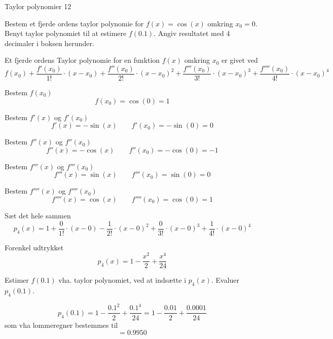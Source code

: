 \documentclass{article}
\begin{document}
\begin{exercise}{Taylor polynomier 12}
	
	Bestem et fjerde ordens taylor polynomie for $f(x) =\cos(x)$ 
	omkring $x_0 = 0$.
	Benyt taylor polynomiet til at estimere $f(0.1)$.
	Angiv resultatet med 4 decimaler i boksen herunder.
	
	\hint
	Et fjerde ordens Taylor polynomie for en funktion $f(x)$
	omkring $x_0$ er givet ved
	\[
	f(x_0) + \frac{f'(x_0)}{1!} \cdot (x - x_0) 
	+ \frac{f''(x_0)}{2!} \cdot (x - x_0)^2 
	+ \frac{f'''(x_0)}{3!} \cdot (x - x_0)^3 
	+ \frac{f''''(x_0)}{4!} \cdot (x - x_0)^4
	\]


	\hint
	Bestem $f(x_0)$
	\[
	f(x_0)  = \cos(0) = 1
	\]

	\hint
	Bestem $f'(x)$ og $f'(x_0)$
	\[
	f'(x) = -\sin(x) \qquad f'(x_0)= -\sin(0) = 0
	\]
	
	\hint
	Bestem $f''(x)$ og $f''(x_0)$	
	\[
	f''(x) = -\cos(x) \qquad f''(x_0)  = - \cos(0) = -1
	\]

	\hint
	Bestem $f'''(x)$ og $f'''(x_0)$
	\[
	f'''(x) = \sin(x) \qquad f'''(x_0) =  \sin(0) = 0
	\]
	
	\hint
	Bestem $f''''(x)$ og $f''''(x_0)$
	\[
	f''''(x) = \cos(x) \qquad f''''(x_0) =  \cos(0) = 1
	\]
	
	\hint
	Sæt det hele sammen
	\[
	p_4(x) = 1 + \frac{0}{1!} \cdot (x-0) - \frac{1}{2!} \cdot (x-0)^2 + \frac{0}{3!} \cdot (x-0)^3	+ \frac{1}{4!} \cdot (x-0)^4
	\]
	
	\hint
	Forenkel udtrykket
	\[
	p_4(x) = 1 - \frac{x^2}{2} + \frac{x^4}{24}
	\]
	
	\hint
	Estimer $f(0.1)$ vha. taylor polynomiet, ved at indsætte i $p_4(x)$.
	Evaluer $p_4(0.1)$.
	
	\hint
	\[
	p_4(0.1) =  1 - \frac{0.1^2}{2} + \frac{0.1^4}{24} = 1 - \frac{0.01}{2} + \frac{0.0001}{24}
	\]
	som vha lommeregner bestemmes til
	\[
	= 0.9950
	\]
\end{exercise}
\end{document}
